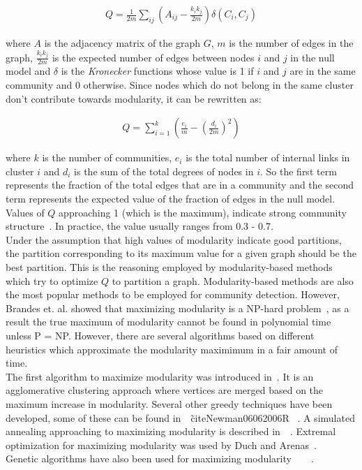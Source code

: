 \begin{spacing}{1.5}
\begin{align}
Q = \frac{1}{2m}\displaystyle\sum_{ij}\left(A_{ij} - \frac{k_i k_j}{2m}\right) \delta(C_i, C_j)
\end{align}

where $A$ is the adjacency matrix of the graph $G$, $m$ is the number of edges in the graph, $\frac{k_i k_j}{2m}$ is the expected number of edges between nodes $i$ and $j$ in the null model and $\delta$ is the \emph{Kronecker} functions whose value is 1 if $i$ and $j$ are in the same community and 0 otherwise. Since nodes which do not belong in the same cluster don't contribute towards modularity, it can be rewritten as:

\begin{align}
Q = \displaystyle\sum_{i = 1}^k\left(\frac{e_i}{m} - \left(\frac{d_i}{2m}\right)^2\right)
\end{align}

where $k$ is the number of communities, $e_i$ is the total number of internal links in cluster $i$ and $d_i$ is the sum of the total degrees of nodes in $i$. So the first term represents the fraction of the total edges that are in a community and the second term represents the expected value of the fraction of edges in the null model. Values of $Q$ approaching 1 (which is the maximum), indicate strong community structure~\cite{PhysRevE.69.026113}. In practice, the value usually ranges from 0.3 - 0.7. \\

Under the assumption that high values of modularity indicate good partitions, the partition corresponding to its maximum value for a given graph should be the best partition. This is the reasoning employed by modularity-based methods which try to optimize $Q$ to partition a graph. Modularity-based methods are also the most popular methods to be employed for community detection. However, Brandes et. al. showed that maximizing modularity is a NP-hard problem~\cite{10.1109/TKDE.2007.190689}, as a result the true maximum of modularity cannot be found in polynomial time unless P = NP. However, there are several algorithms based on different heuristics which approximate the modularity maximimum in a fair amount of time.\\
The first algorithm to maximize modularity was introduced in~\cite{newman03fast}. It is an agglomerative clustering approach where vertices are merged based on the maximum increase in modularity. Several other greedy techniques have been developed, some of these can be found in~\cite{blondel2008fuc}~\cite{Clauset2004}\~cite{Newman06062006R}~\cite{PhysRevE.74.016107} . A simulated annealing approaching to maximizing modularity is described in~\cite{PhysRevE.70.025101}~\cite{PhysRevE.71.046101}. Extremal optimization for maximizing modularity was used by Duch and Arenas~\cite{duch-2005-72}.\\
Genetic algorithms have also been used for maximizing modularity~\cite{Tasgin06gaCommunityDetection}~\cite{2008ppsnpizzuti}~\cite{6045331}~\cite{Pizzuti:2012:BDM:2245276.2245321}.



\end{spacing}